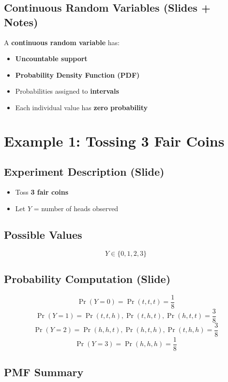 \documentclass[11pt]{article}
\begin{document}
\subsection{Continuous Random Variables (Slides + Notes)}

A \textbf{continuous random variable} has:
\begin{itemize}
    \item \textbf{Uncountable support}
    \item \textbf{Probability Density Function (PDF)}
    \item Probabilities assigned to \textbf{intervals}
    \item Each individual value has \textbf{zero probability}
\end{itemize}

\vspace{1em}

\section{Example 1: Tossing 3 Fair Coins}

\subsection*{Experiment Description (Slide)}

\begin{itemize}
    \item Toss \textbf{3 fair coins}
    \item Let \( Y \) = number of heads observed
\end{itemize}

\subsection*{Possible Values}

\[
Y \in \{0,1,2,3\}
\]

\subsection*{Probability Computation (Slide)}

\[
\Pr(Y=0)=\Pr(t,t,t)=\frac{1}{8}
\]
\[
\Pr(Y=1)=\Pr(t,t,h),\Pr(t,h,t),\Pr(h,t,t)=\frac{3}{8}
\]
\[
\Pr(Y=2)=\Pr(h,h,t),\Pr(h,t,h),\Pr(t,h,h)=\frac{3}{8}
\]
\[
\Pr(Y=3)=\Pr(h,h,h)=\frac{1}{8}
\]

\subsection*{PMF Summary}
\end{document}

